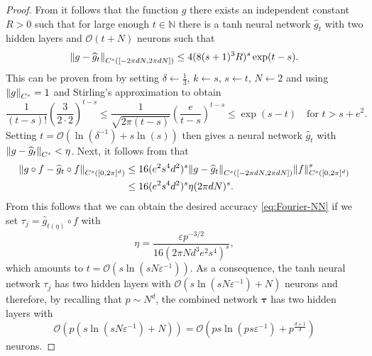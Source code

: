 \documentclass{article}
\numberwithin{equation}{section}
\newcommand{\N}{\mathbb{N}}
\newcommand{\hg}{\widehat{g}}
\renewcommand{\epsilon}{\varepsilon}
\newcommand{\1}{\mathbbm{1}}
\newcommand{\bigO}{\mathcal{O}}
\begin{document}
\begin{proof}
From \cite[Theorem 5.1]{deryck2021approximation} it follows that the function $g$ there exists an independent constant $R>0$ such that for large enough $t\in\N$ there is a tanh neural network $\hg_t$ with two hidden layers and $\bigO(t+N)$ neurons such that
\begin{equation}
    \norm{g-\hg_t}_{C^s([-2\pi dN, 2\pi dN])} \leq 4 (8(s+1)^3R)^{s} \exp(t-s). 
\end{equation}
This can be proven from \cite[eq. (74)]{deryck2021approximation} by setting $\delta\leftarrow\frac{1}{3}$, $k\leftarrow s$, $s\leftarrow t$, $N\leftarrow 2$ and using $\norm{g}_{C^s}=1$ and Stirling's approximation to obtain
\begin{equation}
    \frac{1}{(t-s)!}\left(\frac{3}{2\cdot 2}\right)^{t-s} \leq \frac{1}{\sqrt{2\pi(t-s)}} \left(\frac{e}{t-s}\right)^{t-s} \leq \exp(s-t) \quad \text{for } t>s+e^2. 
\end{equation}
Setting $t = \bigO(\ln(\delta^{-1})+s\ln(s))$ then gives a neural network $\hg_t$ with $\norm{g-\hg_t}_{C^s}<\eta$. Next, it follows from \cite[Lemma A.7]{deryck2021approximation} that
\begin{align}
\begin{split}
    \norm{g\circ f-\hg_t\circ f}_{C^s([0,2\pi]^d)} &\leq 16(e^2s^4d^2)^s \norm{g-\hg_t}_{C^s([-2\pi dN, 2\pi dN])} \norm{f}_{C^s([0,2\pi]^d)}^s\\
    &\leq 16(e^2s^4d^2)^s \eta (2\pi dN)^s. 
\end{split}
\end{align}
From this follows that we can obtain the desired accuracy \eqref{eq:Fourier-NN} if we set $\tau_j = \hg_{t(\eta)}\circ f$ with
\begin{equation}
    \eta = \frac{\epsilon p^{-3/2}}{16(2\pi Nd^3e^2s^4)^{s}},
\end{equation}
which amounts to $t = \bigO(s\ln(sN\epsilon^{-1}))$. As a consequence, the tanh neural network $\tau_j$ has two hidden layers with $\bigO(s\ln(sN\epsilon^{-1})+N)$ neurons and therefore, by recalling that $p\sim N^d$, the combined network $\bm{\tau}$ has two hidden layers with
\begin{equation}
    \bigO(p(s\ln(sN\epsilon^{-1})+N)) = \bigO(ps\ln(ps\epsilon^{-1})+p^{\frac{d+1}{d}})
\end{equation}
neurons. 
\end{proof}
\end{document}
